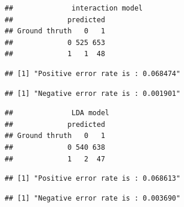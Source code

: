 \documentclass[
]{article}
\newenvironment{Shaded}{\begin{snugshade}}{\end{snugshade}}
\newcommand{\AttributeTok}[1]{\textcolor[rgb]{0.77,0.63,0.00}{#1}}
\newcommand{\CommentTok}[1]{\textcolor[rgb]{0.56,0.35,0.01}{\textit{#1}}}
\newcommand{\DecValTok}[1]{\textcolor[rgb]{0.00,0.00,0.81}{#1}}
\newcommand{\FunctionTok}[1]{\textcolor[rgb]{0.00,0.00,0.00}{#1}}
\newcommand{\NormalTok}[1]{#1}
\newcommand{\OtherTok}[1]{\textcolor[rgb]{0.56,0.35,0.01}{#1}}
\newcommand{\SpecialCharTok}[1]{\textcolor[rgb]{0.00,0.00,0.00}{#1}}
\newcommand{\StringTok}[1]{\textcolor[rgb]{0.31,0.60,0.02}{#1}}
\begin{document}
\begin{verbatim}
##              interaction model 
##             predicted
## Ground thruth   0   1
##             0 525 653
##             1   1  48
\end{verbatim}

\begin{verbatim}
## [1] "Positive error rate is : 0.068474"
\end{verbatim}

\begin{verbatim}
## [1] "Negative error rate is : 0.001901"
\end{verbatim}

\begin{Shaded}
\end{Shaded}

\begin{verbatim}
##              LDA model
##             predicted
## Ground thruth   0   1
##             0 540 638
##             1   2  47
\end{verbatim}

\begin{verbatim}
## [1] "Positive error rate is : 0.068613"
\end{verbatim}

\begin{verbatim}
## [1] "Negative error rate is : 0.003690"
\end{verbatim}
\end{document}

